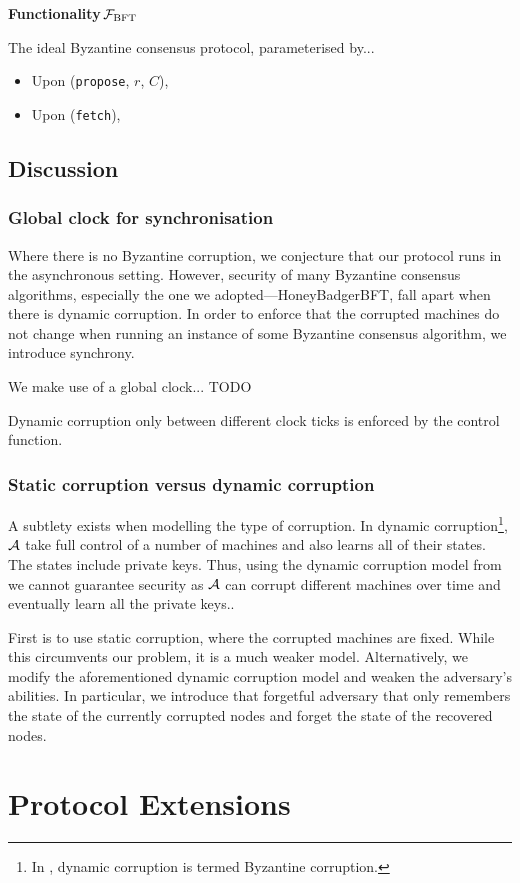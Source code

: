 \begin{framed}
\textbf{Functionality}\,$\mathcal{F}_\text{BFT}$

The ideal Byzantine consensus protocol, parameterised by...

\begin{itemize}
\item Upon (\texttt{propose}, $r$, $C$),
\item Upon (\texttt{fetch}),
\end{itemize}
\end{framed}

\subsection{Discussion}

\subsubsection{Global clock for synchronisation}
Where there is no Byzantine corruption, we conjecture that our protocol runs in the asynchronous setting.
However, security of many Byzantine consensus algorithms, especially the one we adopted---HoneyBadgerBFT,
fall apart when there is dynamic corruption.
In order to enforce that the corrupted machines do not change when running an instance of some Byzantine consensus algorithm,
we introduce synchrony.

We make use of a global clock... TODO

Dynamic corruption only between different clock ticks is enforced by the control function.

\subsubsection{Static corruption versus dynamic corruption}
A subtlety exists when modelling the type of corruption.
In dynamic corruption\footnote{In \cite{canetti2001universally}, dynamic corruption is termed Byzantine corruption.},
$\mathcal{A}$ take full control of a number of machines and also learns all of their states.
The states include private keys.
Thus, using the dynamic corruption model from \cite{canetti2001universally} we cannot guarantee security as
$\mathcal{A}$ can corrupt different machines over time and eventually learn all the private keys..

First is to use static corruption, where the corrupted machines are fixed.
While this circumvents our problem, it is a much weaker model.
Alternatively, we modify the aforementioned dynamic corruption model and weaken the adversary's abilities.
In particular, we introduce that forgetful adversary that only remembers the state of the currently corrupted nodes and forget the state of the recovered nodes.


\section{Protocol Extensions}
\label{sec:protocol-extensions}

